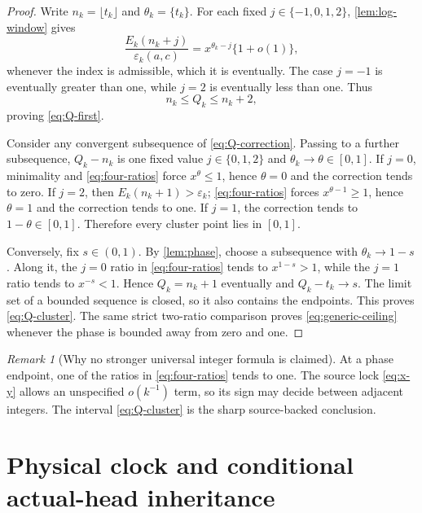 \documentclass[11pt]{article}
\theoremstyle{remark}
\newtheorem{remark}[theorem]{Remark}
\begin{document}
\begin{proof}
Write $n_k=\lfloor t_k\rfloor$ and $\theta_k=\{t_k\}$.  For each fixed
$j\in\{-1,0,1,2\}$, \cref{lem:log-window} gives
\begin{equation}\label{eq:four-ratios}
 \frac{E_k(n_k+j)}{\varepsilon_k(a,c)}
 =x^{\theta_k-j}\{1+o(1)\},
\end{equation}
whenever the index is admissible, which it is eventually.  The case $j=-1$
is eventually greater than one, while $j=2$ is eventually less than one.
Thus
\begin{equation}\label{eq:Q-bracket}
 n_k\le Q_k\le n_k+2,
\end{equation}
proving \eqref{eq:Q-first}.

Consider any convergent subsequence of \eqref{eq:Q-correction}.  Passing to a
further subsequence, $Q_k-n_k$ is one fixed value $j\in\{0,1,2\}$ and
$\theta_k\to\theta\in[0,1]$.  If $j=0$, minimality and
\eqref{eq:four-ratios} force $x^\theta\le1$, hence $\theta=0$ and the
correction tends to zero.  If $j=2$, then $E_k(n_k+1)>\varepsilon_k$;
\eqref{eq:four-ratios} forces $x^{\theta-1}\ge1$, hence $\theta=1$ and the
correction tends to one.  If $j=1$, the correction tends to $1-\theta\in[0,1]$.
Therefore every cluster point lies in $[0,1]$.

Conversely, fix $s\in(0,1)$.  By \cref{lem:phase}, choose a subsequence with
$\theta_k\to1-s$.  Along it, the $j=0$ ratio in
\eqref{eq:four-ratios} tends to $x^{1-s}>1$, while the $j=1$ ratio tends to
$x^{-s}<1$.  Hence $Q_k=n_k+1$ eventually and
$Q_k-t_k\to s$.  The limit set of a bounded sequence is closed, so it also
contains the endpoints.  This proves \eqref{eq:Q-cluster}.  The same strict
two-ratio comparison proves \eqref{eq:generic-ceiling} whenever the phase is
bounded away from zero and one.
\end{proof}

\begin{remark}[Why no stronger universal integer formula is claimed]
At a phase endpoint, one of the ratios in \eqref{eq:four-ratios} tends to one.
The source lock \eqref{eq:x-y} allows an unspecified $o(k^{-1})$ term, so its
sign may decide between adjacent integers.  The interval
\eqref{eq:Q-cluster} is the sharp source-backed conclusion.
\end{remark}

\section{Physical clock and conditional actual-head inheritance}
\end{document}
